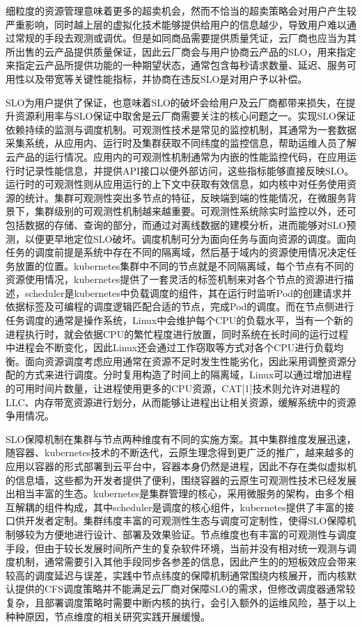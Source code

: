 细粒度的资源管理意味着更多的超卖机会，然而不恰当的超卖策略会对用户产生较严重影响，同时越上层的虚拟化技术能够提供给用户的信息越少，导致用户难以通过常规的手段去观测或调优。但是如同商品需要提供质量凭证，云厂商也应当为其所出售的云产品提供质量保证，因此云厂商会与用户协商云产品的SLO，用来指定来指定云产品所提供功能的一种期望状态，通常包含每秒请求数量、延迟、服务可用性以及带宽等关键性能指标，并协商在违反SLO是对用户予以补偿。

SLO为用户提供了保证，也意味着SLO的破坏会给用户及云厂商都带来损失，在提升资源利用率与SLO保证中取舍是云厂商需要关注的核心问题之一。实现SLO保证依赖持续的监测与调度机制。可观测性技术是常见的监控机制，其通常为一套数据采集系统，从应用内、运行时及集群获取不同纬度的监控信息，帮助运维人员了解云产品的运行情况。应用内的可观测性机制通常为内嵌的性能监控代码，在应用运行时记录性能信息，并提供API接口以便外部访问，这些指标能够直接反映SLO。运行时的可观测性则从应用运行的上下文中获取有效信息，如内核中对任务使用资源的统计。集群可观测性突出多节点的特征，反映端到端的性能情况，在微服务背景下，集群级别的可观测性机制越来越重要。可观测性系统除实时监控以外，还可包括数据的存储、查询的部分，而通过对离线数据的建模分析，进而能够对SLO预测，以便更早地定位SLO破坏。调度机制可分为面向任务与面向资源的调度。面向任务的调度前提是系统中存在不同的隔离域，然后基于域内的资源使用情况决定任务放置的位置。kubernetes集群中不同的节点就是不同隔离域，每个节点有不同的资源使用情况，kubernetes提供了一套灵活的标签机制来对各个节点的资源进行描述，scheduler是kubernetes中负载调度的组件，其在运行时监听Pod的创建请求并依据标签及可编程的调度逻辑匹配合适的节点，完成Pod的调度。而在节点侧进行任务调度的通常是操作系统，Linux中会维护每个CPU的负载水平，当有一个新的进程执行时，就会依据CPU的繁忙程度进行放置，同时系统在长时间的运行过程中进程会不断变化，因此Linux还会通过工作窃取等方式对各个CPU进行负载均衡。面向资源调度考虑应用通常在资源不足时发生性能劣化，因此采用调整资源分配的方式来进行调度。分时复用构造了时间上的隔离域，Linux可以通过增加进程的可用时间片数量，让进程使用更多的CPU资源，CAT[1]技术则允许对进程的LLC、内存带宽资源进行划分，从而能够让进程出让相关资源，缓解系统中的资源争用情况。

SLO保障机制在集群与节点两种维度有不同的实施方案。其中集群维度发展迅速，随容器、kubernetes技术的不断迭代，云原生理念得到更广泛的推广，越来越多的应用以容器的形式部署到云平台中，容器本身仍然是进程，因此不存在类似虚拟机的信息墙，这些都为开发者提供了便利，围绕容器的云原生可观测性技术已经发展出相当丰富的生态。kubernetes是集群管理的核心，采用微服务的架构，由多个相互解耦的组件构成，其中scheduler是调度的核心组件，kubernetes提供了丰富的接口供开发者定制。集群纬度丰富的可观测性生态与调度可定制性，使得SLO保障机制够较为方便地进行设计、部署及效果验证。节点维度也有丰富的可观测性与调度手段，但由于较长发展时间所产生的复杂软件环境，当前并没有相对统一观测与调度机制，通常需要引入其他手段同步各参差的信息，因此产生的的短板效应会带来较高的调度延迟与误差，实践中节点纬度的保障机制通常围绕内核展开，而内核默认提供的CFS调度策略并不能满足云厂商对保障SLO的需求，但修改调度器通常较复杂，且部署调度策略时需要中断内核的执行，会引入额外的运维风险，基于以上种种原因，节点维度的相关研究实践开展缓慢。

